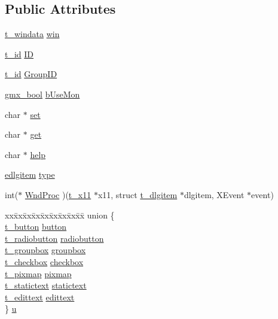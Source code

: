 \subsection*{\-Public \-Attributes}
\begin{DoxyCompactItemize}
\item 
\hyperlink{structt__windata}{t\-\_\-windata} \hyperlink{structt__dlgitem_ad97aed98f71ee50c25cad6f32ee705a0}{win}
\item 
\hyperlink{xdlgitem_8h_aa48ef3a63f16552c3ae513baa87d8942}{t\-\_\-id} \hyperlink{structt__dlgitem_a7c9301ff41f7f8452f605f46f598a742}{\-I\-D}
\item 
\hyperlink{xdlgitem_8h_aa48ef3a63f16552c3ae513baa87d8942}{t\-\_\-id} \hyperlink{structt__dlgitem_acef0fa25484d61dc547a5f965302668f}{\-Group\-I\-D}
\item 
\hyperlink{include_2types_2simple_8h_a8fddad319f226e856400d190198d5151}{gmx\-\_\-bool} \hyperlink{structt__dlgitem_aa7aca5aed540a24bb355213e702229c0}{b\-Use\-Mon}
\item 
char $\ast$ \hyperlink{structt__dlgitem_a1085bac2b30966f5d2006d559e92779d}{set}
\item 
char $\ast$ \hyperlink{structt__dlgitem_af0bfaa74c5d1e683a79409572be8994f}{get}
\item 
char $\ast$ \hyperlink{structt__dlgitem_a08c4911806b93dae2da41b6067836007}{help}
\item 
\hyperlink{xdlgitem_8h_a48a67f56004b9395af9513ddbb49a8e6}{edlgitem} \hyperlink{structt__dlgitem_a22d16008d103a5d358059b97b9c8e3be}{type}
\item 
int($\ast$ \hyperlink{structt__dlgitem_ae8a2419b3211094acc31c631e4799683}{\-Wnd\-Proc} )(\hyperlink{structt__x11}{t\-\_\-x11} $\ast$x11, struct \hyperlink{structt__dlgitem}{t\-\_\-dlgitem} $\ast$dlgitem, \-X\-Event $\ast$event)
\item 
\begin{tabbing}
xx\=xx\=xx\=xx\=xx\=xx\=xx\=xx\=xx\=\kill
union \{\\
\>\hyperlink{structt__button}{t\_button} \hyperlink{structt__dlgitem_a2f6d08290b31ebd28d50cbbc23b7c67e}{button}\\
\>\hyperlink{structt__radiobutton}{t\_radiobutton} \hyperlink{structt__dlgitem_aabac5678c4da97f1c7d5820da3092929}{radiobutton}\\
\>\hyperlink{structt__groupbox}{t\_groupbox} \hyperlink{structt__dlgitem_a3197d163d54a68beeb9262f544a81641}{groupbox}\\
\>\hyperlink{structt__checkbox}{t\_checkbox} \hyperlink{structt__dlgitem_a13c8fcf0cb47e5cd6a6d719f01abfdde}{checkbox}\\
\>\hyperlink{structt__pixmap}{t\_pixmap} \hyperlink{structt__dlgitem_a09c735f22b8b7285ba640a9abcb96d48}{pixmap}\\
\>\hyperlink{structt__statictext}{t\_statictext} \hyperlink{structt__dlgitem_a6c434871e8289fbadf9fa02d50356c33}{statictext}\\
\>\hyperlink{structt__edittext}{t\_edittext} \hyperlink{structt__dlgitem_a0d11a3521aeeaeaf7c33ded23ae47693}{edittext}\\
\} \hyperlink{structt__dlgitem_ad83bf0f5c6b971ca338cc7add3b23dc9}{u}\\


\end{tabbing}
\end{DoxyCompactItemize}
